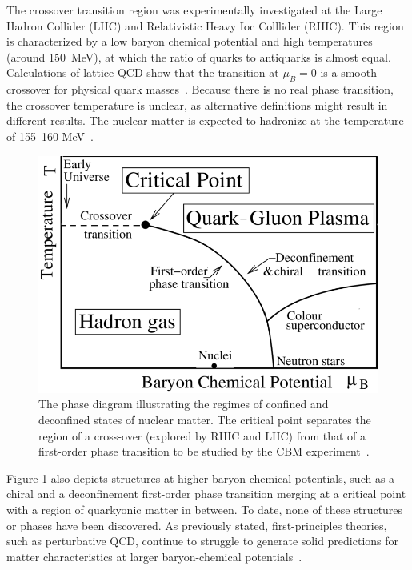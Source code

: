 The crossover transition region was experimentally investigated at the Large Hadron Collider (\gls{LHC}) and Relativistic Heavy Ioc Colllider (\gls{RHIC}). This region is characterized by a low baryon chemical potential and high temperatures (around 150~MeV), at which the ratio of quarks to antiquarks is almost equal. Calculations of lattice \gls{QCD} show that the transition at $\mu_{B} = 0$ is a smooth crossover for
physical quark masses~\cite{Aoki_2006}. Because there is no real phase transition, the crossover temperature is unclear, as alternative definitions might result in different results. The nuclear matter is expected to hadronize at the temperature of 155--160 MeV~\cite{Bazavov_2012, Stachel_2014}.



\begin{figure}[!h]
\centering
 \includegraphics[width=0.65\columnwidth]{Chapter1/images/phase.png}
\caption{The phase diagram illustrating the regimes of confined and deconfined states of nuclear matter. The critical point separates the region of a cross-over (explored by RHIC and LHC) from that of a first-order phase transition to be studied by the CBM experiment~\cite{friese_diagram}.}
\label{fig_phase}
\end{figure}
\newpage
Figure \ref{fig_phase} also depicts structures at higher baryon-chemical potentials, such as a chiral and a deconfinement first-order phase transition merging at a critical point with a region of quarkyonic matter in between. To date, none of these structures or phases have been discovered. As previously stated, first-principles theories, such as perturbative QCD, continue to struggle to generate solid predictions for matter characteristics at larger baryon-chemical potentials~\cite{Sakai_2008, Fischer_01, Tawfik_01}. 



